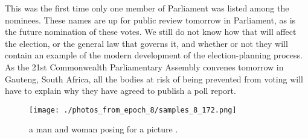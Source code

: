 \documentclass{article}%
\begin{document}
This was the first time only one member of Parliament was listed among the nominees. These names are up for public review tomorrow in Parliament, as is the future nomination of these votes. We still do not know how that will affect the election, or the general law that governs it, and whether or not they will contain an example of the modern development of the election{-}planning process.\newline%
As the 21st Commonwealth Parliamentary Assembly convenes tomorrow in Gauteng, South Africa, all the bodies at risk of being prevented from voting will have to explain why they have agreed to publish a poll report.\newline%

%


\begin{figure}[h!]%
\centering%
\texttt{[image: ./photos\_from\_epoch\_8/samples\_8\_172.png]}%
\caption{a man and woman posing for a picture .}%
\end{figure}

%
\end{document}
